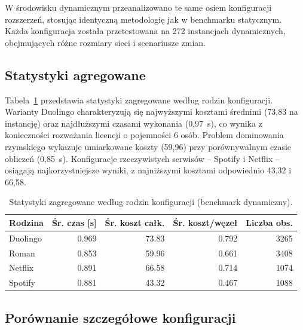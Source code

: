 W środowisku dynamicznym przeanalizowano te same osiem konfiguracji rozszerzeń, stosując identyczną metodologię jak w benchmarku statycznym. Każda konfiguracja została przetestowana na 272 instancjach dynamicznych, obejmujących różne rozmiary sieci i scenariusze zmian.

\subsection{Statystyki agregowane}

Tabela~\ref{tab:ext-dynamic-family} przedstawia statystyki zagregowane według rodzin konfiguracji. Warianty Duolingo charakteryzują się najwyższymi kosztami średnimi (73,83 na instancję) oraz najdłuższymi czasami wykonania (0,97~s), co wynika z konieczności rozważania licencji o pojemności 6 osób. Problem dominowania rzymskiego wykazuje umiarkowane koszty (59,96) przy porównywalnym czasie obliczeń (0,85~s). Konfiguracje rzeczywistych serwisów -- Spotify i Netflix -- osiągają najkorzystniejsze wyniki, z najniższymi kosztami odpowiednio 43,32 i 66,58.

\begin{table}[H]
  \centering
  \caption{Statystyki zagregowane według rodzin konfiguracji (benchmark dynamiczny).}
  \label{tab:ext-dynamic-family}
  \begin{tabular}{lrrrr}
    \toprule
    \textbf{Rodzina} & \textbf{Śr. czas [s]} & \textbf{Śr. koszt całk.} & \textbf{Śr. koszt/węzeł} & \textbf{Liczba obs.} \\
    \midrule
    Duolingo         & 0.969                 & 73.83                    & 0.792                    & 3265                 \\
    Roman            & 0.853                 & 59.96                    & 0.661                    & 3408                 \\
    Netflix          & 0.891                 & 66.58                    & 0.714                    & 1074                 \\
    Spotify          & 0.881                 & 43.32                    & 0.467                    & 1088                 \\
    \bottomrule
  \end{tabular}
\end{table}

\subsection{Porównanie szczegółowe konfiguracji}

